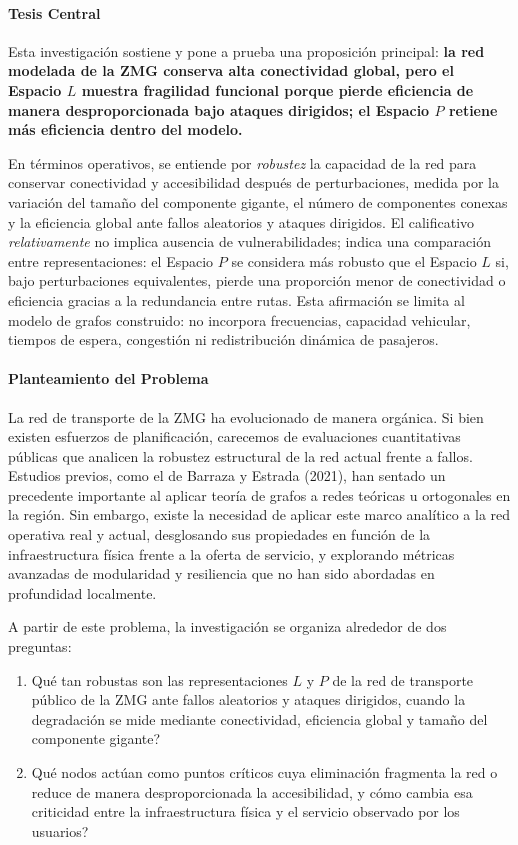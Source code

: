 \paragraph{Tesis Central}

Esta investigación sostiene y pone a prueba una proposición principal: \textbf{la red modelada de la ZMG conserva alta conectividad global, pero el Espacio \(L\) muestra fragilidad funcional porque pierde eficiencia de manera desproporcionada bajo ataques dirigidos; el Espacio \(P\) retiene más eficiencia dentro del modelo.}

En términos operativos, se entiende por \emph{robustez} la capacidad de la red para conservar conectividad y accesibilidad después de perturbaciones, medida por la variación del tamaño del componente gigante, el número de componentes conexas y la eficiencia global ante fallos aleatorios y ataques dirigidos. El calificativo \emph{relativamente} no implica ausencia de vulnerabilidades; indica una comparación entre representaciones: el Espacio $P$ se considera más robusto que el Espacio $L$ si, bajo perturbaciones equivalentes, pierde una proporción menor de conectividad o eficiencia gracias a la redundancia entre rutas. Esta afirmación se limita al modelo de grafos construido: no incorpora frecuencias, capacidad vehicular, tiempos de espera, congestión ni redistribución dinámica de pasajeros.

\paragraph{Planteamiento del Problema}

La red de transporte de la ZMG ha evolucionado de manera orgánica. Si bien existen esfuerzos de planificación, carecemos de evaluaciones cuantitativas públicas que analicen la robustez estructural de la red actual frente a fallos. Estudios previos, como el de Barraza y Estrada (2021), han sentado un precedente importante al aplicar teoría de grafos a redes teóricas u ortogonales en la región. Sin embargo, existe la necesidad de aplicar este marco analítico a la red operativa real y actual, desglosando sus propiedades en función de la infraestructura física frente a la oferta de servicio, y explorando métricas avanzadas de modularidad y resiliencia que no han sido abordadas en profundidad localmente.

A partir de este problema, la investigación se organiza alrededor de dos preguntas:
\begin{enumerate}
    \item \invquestion{}Qué tan robustas son las representaciones $L$ y $P$ de la red de transporte público de la ZMG ante fallos aleatorios y ataques dirigidos, cuando la degradación se mide mediante conectividad, eficiencia global y tamaño del componente gigante?
    \item \invquestion{}Qué nodos actúan como puntos críticos cuya eliminación fragmenta la red o reduce de manera desproporcionada la accesibilidad, y cómo cambia esa criticidad entre la infraestructura física y el servicio observado por los usuarios?
\end{enumerate}

